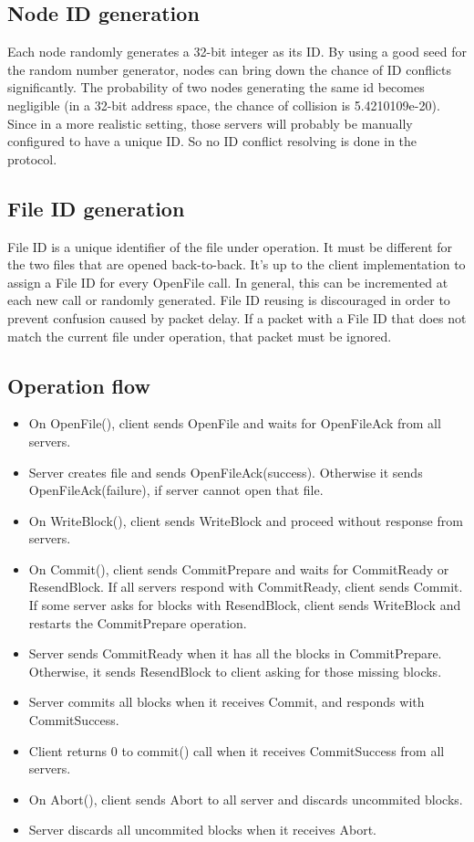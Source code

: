 \documentclass[11pt]{article} %
\begin{document}
\subsection{Node ID generation}
Each node randomly generates a 32-bit integer as its ID.
By using a good seed for the random number generator, 
nodes can bring down the chance of ID conflicts significantly. 
The probability of two nodes generating the same id becomes negligible 
(in a 32-bit address space, the chance of collision is 5.4210109e-20).
Since in a more realistic setting, those servers will probably be manually configured 
to have a unique ID. So no ID conflict resolving is done in the protocol.

\subsection{File ID generation}
File ID is a unique identifier of the file under operation. 
It must be different for the two files that are opened back-to-back.
It's up to the client implementation to assign a File ID for every OpenFile call.
In general, this can be incremented at each new call or randomly generated.
File ID reusing is discouraged in order to prevent confusion caused by packet delay.
If a packet with a File ID that does not match the current file under operation,
that packet must be ignored.

\subsection{Operation flow}
\begin{itemize}
    \item On OpenFile(), client sends OpenFile and waits for OpenFileAck from all servers.
    \item Server creates file and sends OpenFileAck(success). 
        Otherwise it sends OpenFileAck(failure), if server cannot open that file.
    \item On WriteBlock(), client sends WriteBlock and proceed without response from servers.
    \item On Commit(), client sends CommitPrepare and waits for CommitReady or ResendBlock.
        If all servers respond with CommitReady, client sends Commit.
        If some server asks for blocks with ResendBlock, client sends WriteBlock
        and restarts the CommitPrepare operation.
    \item Server sends CommitReady when it has all the blocks in CommitPrepare.
        Otherwise, it sends ResendBlock to client asking for those missing blocks.
    \item Server commits all blocks when it receives Commit, 
        and responds with CommitSuccess.
    \item Client returns 0 to commit() call when it receives CommitSuccess from all servers.\
    \item On Abort(), client sends Abort to all server and discards uncommited blocks.
    \item Server discards all uncommited blocks when it receives Abort.
\end{itemize}
\end{document}
